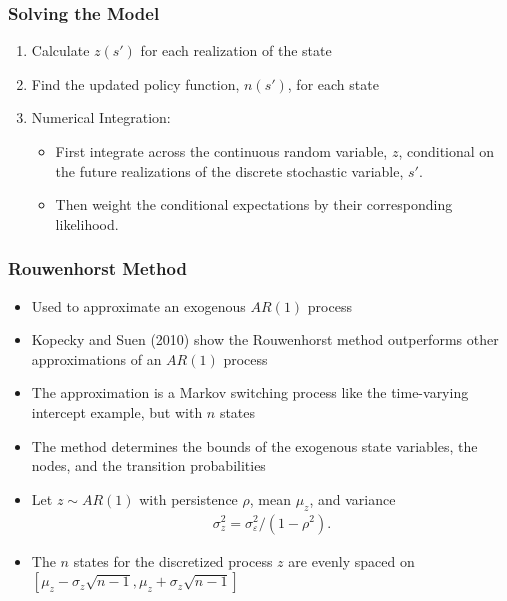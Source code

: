 \documentclass[11pt]{beamer}
\begin{document}
\begin{frame}\frametitle{Solving the Model}

\begin{enumerate}\setlength{\itemsep}{10pt}
  \item Calculate $z(s')$ for each realization of the state
  \item Find the updated policy function, $n(s')$, for each state
  \item Numerical Integration:
  \begin{itemize}\setlength{\itemsep}{5pt}
    \item First integrate across the continuous random variable, $z$, conditional on the future realizations of the discrete stochastic variable, $s'$.%
    \item Then weight the conditional expectations by their corresponding likelihood. %
  \end{itemize}
\end{enumerate}

\end{frame}


\begin{frame}\frametitle{Rouwenhorst Method}

\begin{itemize}\setlength{\itemsep}{8pt}
  \item Used to approximate an exogenous $AR(1)$ process
  \item Kopecky and Suen (2010) show the Rouwenhorst method outperforms other approximations of an $AR(1)$ process
  \item The approximation is a Markov switching process like the time-varying intercept example, but with $n$ states
  \item The method determines the bounds of the exogenous state variables, the nodes, and the transition probabilities
  \item Let $z\sim AR(1)$ with persistence $\rho$, mean $\mu_z$, and variance %
  \begin{gather*}
    \sigma_z^2 = \sigma_\varepsilon^2/(1-\rho^2).
  \end{gather*}
  \item The $n$ states for the discretized process $z$ are evenly spaced on $[\mu_z-\sigma_z\sqrt{n-1},\mu_z+\sigma_z\sqrt{n-1}]$
\end{itemize}

\end{frame}
\end{document}
